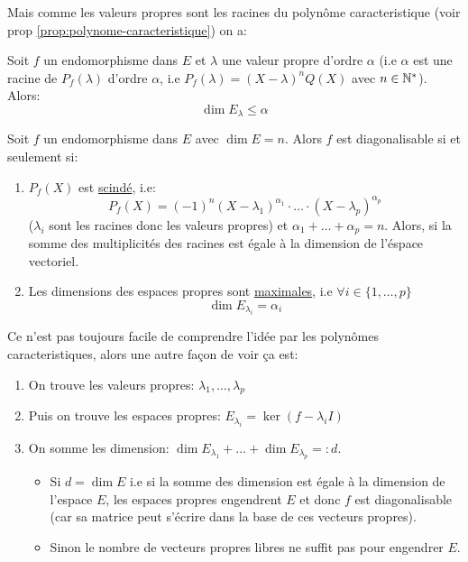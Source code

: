 Mais comme les valeurs propres sont les racines du polynôme caracteristique (voir prop \ref{prop:polynome-caracteristique}) on a:
\begin{prop}
   Soit $f$ un endomorphisme dans $E$ et  $\lambda$ une valeur propre d'ordre  $\alpha$ (i.e $\alpha$ est une racine de  $P_f(\lambda)$ d'ordre  $\alpha$, i.e  $P_f(\lambda) = (X - \lambda)^nQ(X)$ avec  $n \in \mathbb{N}^*$). Alors:
   \[
   \dim E_{\lambda} \le \alpha
   \] 
\end{prop}
\begin{theorem}
   Soit $f$ un endomorphisme dans  $E$ avec $\dim E = n$. Alors  $f$ est diagonalisable si et seulement si: 
   \begin{enumerate}
       \item $P_f(X)$ est \underline{scindé}, i.e:
            \[
                P_f(X) = (-1)^n (X - \lambda_1)^{\alpha_1} \cdot \ldots \cdot (X - \lambda_p)^{\alpha_p}
           \] 
           ($\lambda_i$ sont les racines donc les valeurs propres) et $\alpha_1 + \ldots + \alpha_p = n$. Alors, si la somme des multiplicités des racines est égale à la dimension de l'éspace vectoriel.
       \item Les dimensions des espaces propres sont \underline{maximales}, i.e $\forall i \in \{1, \ldots, p\}$
           \[
                \dim E_{\lambda_i} = \alpha_i 
           \] 
   \end{enumerate}
\end{theorem}
\begin{intuition}
   Ce n'est pas toujours facile de comprendre l'idée par les polynômes caracteristiques, alors une autre façon de voir ça est:
   \begin{enumerate}
       \item On trouve les valeurs propres: $\lambda_1, \ldots, \lambda_p$
       \item Puis on trouve les espaces propres: $E_{\lambda_i} = \ker(f - \lambda_i I)$
       \item On somme les dimension: $\dim E_{\lambda_1} + \ldots + \dim E_{\lambda_p} =: d$.  
           \begin{itemize}
               \item 
                   Si $d = \dim E$ i.e si la somme des dimension est égale à la dimension de l'espace  $E$, les espaces propres engendrent  $E$ et donc  $f$ est diagonalisable (car sa matrice peut s'écrire dans la base de ces vecteurs propres).
              \item Sinon le nombre de vecteurs propres libres ne suffit pas pour engendrer  $E$.
           \end{itemize}
   \end{enumerate}
\end{intuition}

